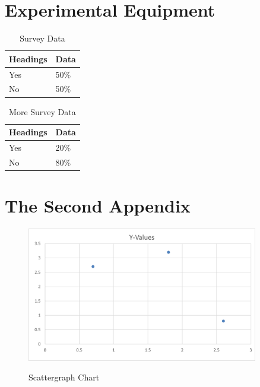
\begin{theappendices}

\chapter{Experimental Equipment}

\begin{table}[h!]
\caption[]{Survey Data}
\begin{tabular}{|L{0.2\textwidth}|L{0.2\textwidth}|}
\hline
\textbf{Headings} & \textbf{Data} \\ \hline
Yes               & 50\%          \\ \hline
No                & 50\%          \\ \hline
\end{tabular}
\end{table}

\vspace{\baselineskip}
\begin{table}[h!]
\caption[]{More Survey Data}
\begin{tabular}{|L{0.2\textwidth}|L{0.2\textwidth}|}
\hline
\textbf{Headings} & \textbf{Data} \\ \hline
Yes               & 20\%          \\ \hline
No                & 80\%          \\ \hline
\end{tabular}
\end{table}
\vspace{\baselineskip}

\chapter{The Second Appendix}

\begin{figure}[htb!]
    \caption[]{Scattergraph Chart}
    
    \includegraphics[width = 0.9\textwidth]{Figures/graph.png}
    \label{fig:graph}
\end{figure}
\FloatBarrier

\end{theappendices}